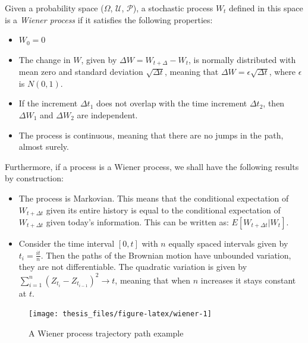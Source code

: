 \documentclass[12pt,oneside]{reedthesis}
\theoremstyle{definition}
\theoremstyle{definition}
\theoremstyle{remark}
\begin{document}
  \protect\hypertarget{def:unnamed-chunk-2}{}{\label{def:unnamed-chunk-2}
  {} }Given a probability space (\(\Omega\),
  \(\mathcal {U}\), \(\mathcal {P}\)), a stochastic process \(W_t\)
  defined in this space is a \emph{Wiener process} if it satisfies the
  following properties:
  \begin{itemize}
    \item  $W_{0}=0$
    
    \item The change in $W$, given by $\Delta W = W_{t+\Delta}-W_{t}$, is normally distributed with mean zero and standard deviation $\sqrt{\Delta t}$, meaning that $\Delta W = \epsilon\sqrt{\Delta t}$, where $\epsilon$ is $N(0,1)$.
    
    \item If the increment $\Delta t_1$ does not overlap with the time increment $\Delta t_2$, then $\Delta W_1$ and $\Delta W_2$ are independent.
    
    \item The process is continuous, meaning that there are no jumps in the path, almost surely.
  
  \end{itemize}
  
  Furthermore, if a process is a Wiener process, we shall have the
  following results by construction:
  \begin{itemize}  
    \item The process is Markovian. This means that the conditional expectation of $W_{t+\Delta t}$ given its entire history is equal to the conditional expectation of $W_{t+\Delta t}$ given today's information. This can be written as: $E[W_{t+\Delta t}|W_t]$.
    
    \item Consider the time interval $[0,t]$ with $n$ equally spaced intervals given by $t_i = \frac{it}{n}$. Then the paths of the Brownian motion have unbounded variation, they are not differentiable. The quadratic variation is given by $\sum_{i=1}^{n}{(Z_{t_i}-Z_{t_{i-1}})^2} \rightarrow t$, meaning that when $n$ increases it stays constant at $t$. 
  \end{itemize}
  \begin{figure}
  
  {\centering \texttt{[image: thesis\_files/figure-latex/wiener-1]} 
  
  }
  
  \caption{A Wiener process trajectory path example \label{wiener}}\label{fig:wiener}
  \end{figure}
\end{document}
